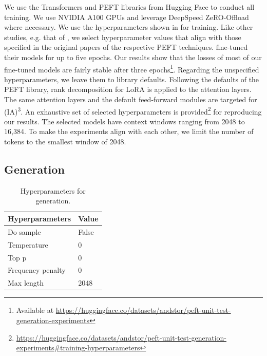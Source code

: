 \documentclass[12pt]{book}
\begin{document}
We use the Transformers \citep{wolf-etal-2020-transformers} and PEFT libraries \citep{peft} from Hugging Face to conduct all training. We use NVIDIA A100 GPUs and leverage DeepSpeed ZeRO-Offload \citep{Ren2021ZeROOffloadDB} where necessary. We use the hyperparameters shown in  for training. Like other studies, e.g. that of \citet{weyssow2024exploring}, we select hyperparameter values that align with those specified in the original papers of the respective PEFT techniques. \citet{weyssow2024exploring} fine-tuned their models for up to five epochs. Our results show that the losses of most of our fine-tuned models are fairly stable after three epochs\footnote{Available at \url{https://huggingface.co/datasets/andstor/peft-unit-test-generation-experiments}}. Regarding the unspecified hyperparameters, we leave them to library defaults. Following the defaults of the PEFT library, rank decomposition for LoRA is applied to the attention layers. The same attention layers and the default feed-forward modules are targeted for (IA)\textsuperscript{3}. An exhaustive set of selected hyperparameters is provided\footnote{\url{https://huggingface.co/datasets/andstor/peft-unit-test-generation-experiments\#training-hyperparameters}} for reproducing our results. The selected models have context windows ranging from 2048 to 16,384. To make the experiments align with each other, we limit the number of tokens to the smallest window of 2048.

\subsection{Generation}
\label{sec:experimental-design-generation}

\begin{table}[htpb]
    \centering
    \small
    \caption{Hyperparameters for generation.}
    \label{tab:hyperparameters-generation}
    \begin{tabularx}{\textwidth}{lR}
    \toprule
    \textbf{Hyperparameters} & \textbf{Value} \\
    \midrule
    Do sample                         & False \\
    Temperature                           & 0 \\
    Top p                                & 0 \\
    Frequency penalty                     & 0 \\
    Max length                         & 2048 \\
    \bottomrule
    \end{tabularx}
\end{table}
\end{document}

